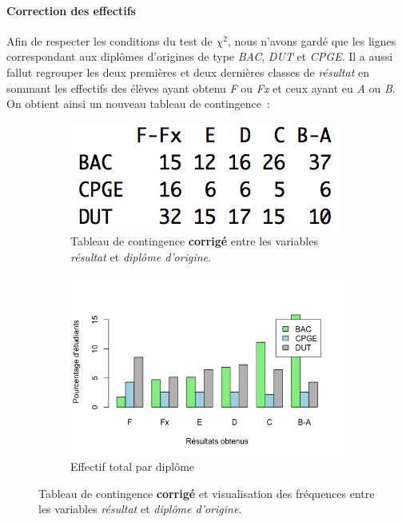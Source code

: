 \documentclass[a4paper,12pt]{report}
\begin{document}
\paragraph{Correction des effectifs}
Afin de respecter les conditions du test de $\chi^2$, nous n'avons gardé que les lignes correspondant aux diplômes d'origines de type \textit{BAC}, \textit{DUT} et \textit{CPGE}. Il a aussi fallut regrouper les deux premières et deux dernières classes de \textit{résultat} en sommant les effectifs des élèves ayant obtenu \textit{F} ou \textit{Fx} et ceux ayant eu \textit{A} ou \textit{B}.\\
On obtient ainsi un nouveau tableau de contingence~:

\begin{figure}[h]
	\centering
	\captionsetup{justification=centering, margin=2cm}
	\begin{subfigure}[b]{0.5\linewidth}
		\centering
		\captionsetup{justification=centering, margin=1cm}
		\includegraphics[width=0.5\linewidth]{img/1-1-2-Contingence-Result-Diplome-Corrigee}
		\caption{\scriptsize Tableau de contingence \textbf{corrigé} entre les variables \textit{résultat} et \textit{diplôme d'origine}.}
		\label{fig:tab_effectifs_et_contingence_resultats_diplome_origine_corrigee}
	\end{subfigure}%
	\begin{subfigure}[b]{0.5\linewidth}
		\centering
		\captionsetup{justification=centering, margin=1cm}
		\includegraphics[width=1\linewidth]{img/1-1-2-Ratio-resultat-diplome}
		\caption{\scriptsize Effectif total par diplôme}
		\label{fig:ratio_resultats_diplome}
	\end{subfigure}%
	\caption{
		\small Tableau de contingence \textbf{corrigé} et visualisation des fréquences entre les variables \textit{résultat} et \textit{diplôme d'origine}.
	}
	\label{fig:tab_frequence_et_contingence_corriges_resultats_diplome_origine}%
\end{figure}
\end{document}
